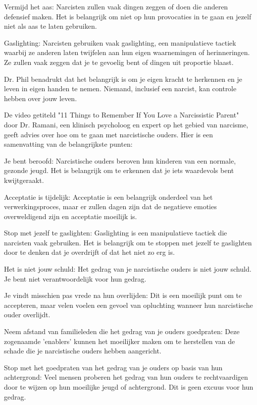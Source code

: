 Vermijd het aas: Narcisten zullen vaak dingen zeggen of doen die anderen defensief maken. Het is belangrijk om niet op hun provocaties in te gaan en jezelf niet als aas te laten gebruiken.

Gaslighting: Narcisten gebruiken vaak gaslighting, een manipulatieve tactiek waarbij ze anderen laten twijfelen aan hun eigen waarnemingen of herinneringen. Ze zullen vaak zeggen dat je te gevoelig bent of dingen uit proportie blaast.

Dr. Phil benadrukt dat het belangrijk is om je eigen kracht te herkennen en je leven in eigen handen te nemen. Niemand, inclusief een narcist, kan controle hebben over jouw leven.

De video getiteld "11 Things to Remember If You Love a Narcissistic Parent" door Dr. Ramani, een klinisch psycholoog en expert op het gebied van narcisme, geeft advies over hoe om te gaan met narcistische ouders. Hier is een samenvatting van de belangrijkste punten:

Je bent beroofd: Narcistische ouders beroven hun kinderen van een normale, gezonde jeugd. Het is belangrijk om te erkennen dat je iets waardevols bent kwijtgeraakt.

Acceptatie is tijdelijk: Acceptatie is een belangrijk onderdeel van het verwerkingsproces, maar er zullen dagen zijn dat de negatieve emoties overweldigend zijn en acceptatie moeilijk is.

Stop met jezelf te gaslighten: Gaslighting is een manipulatieve tactiek die narcisten vaak gebruiken. Het is belangrijk om te stoppen met jezelf te gaslighten door te denken dat je overdrijft of dat het niet zo erg is.

Het is niet jouw schuld: Het gedrag van je narcistische ouders is niet jouw schuld. Je bent niet verantwoordelijk voor hun gedrag.

Je vindt misschien pas vrede na hun overlijden: Dit is een moeilijk punt om te accepteren, maar velen voelen een gevoel van opluchting wanneer hun narcistische ouder overlijdt.

Neem afstand van familieleden die het gedrag van je ouders goedpraten: Deze zogenaamde 'enablers' kunnen het moeilijker maken om te herstellen van de schade die je narcistische ouders hebben aangericht.

Stop met het goedpraten van het gedrag van je ouders op basis van hun achtergrond: Veel mensen proberen het gedrag van hun ouders te rechtvaardigen door te wijzen op hun moeilijke jeugd of achtergrond. Dit is geen excuus voor hun gedrag.

